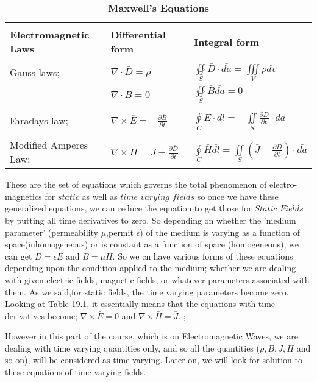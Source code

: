  \begin{table}[h]
 	\caption{\textbf{Maxwell's Equations}}
 	\centering
 	\begin{tabular}{p{3cm} p{2cm} p{2cm}}
 		\hline \\
 		\textbf{Electromagnetic Laws} & \textbf{Differential form} & \textbf{Integral form} \\ [0.5ex]
 		\hline \\
 		Gauss laws; & $\nabla\cdot\bar{D}=\rho$ & $\oiint\limits_S\bar{D}\cdot\bar{da}=\iiint\limits_V
 		\rho dv$\\
 		 & $\nabla\cdot\bar{B}=0$ & $\oiint\limits_S\bar{B}\bar{da}=0$\\
 		 \hline \\
 		 
 		 Faradays law; & $\nabla\times\bar{E}=-\frac{\partial\bar{B}}{\partial t}$ & $\oint\limits_C\bar{E}\cdot\bar{dl}=-\iint\limits_S\frac{\partial\bar{D}}{\partial t}\cdot\bar{da}$ \\
 		 \hline \\
 		 Modified Amperes Law; &
 		 $\nabla\times\bar{H}=\bar{J}+\frac{\partial\bar{D}}{\partial t}$ & $\oint\limits_C\bar{H}\bar{dl}=\iint\limits_S(\bar{J}+\frac{\partial\bar{D}}{\partial t})\cdot\bar{da}$ \\
 		 \hline
 	 	\end{tabular}
 \end{table}


These are the set of equations which governs the total phenomenon of electro-magnetics for $static$ as well as $time$ $varying$ $fields$ so once we have these generalized equations, we can reduce the equation to get those for $Static$ $Fields$ by putting all time derivatives to zero. So depending on whether the 'medium parameter' (permeability $\mu$,permit $\epsilon$) of the medium is varying as a function of space(inhomogeneous) or is constant as a function of space (homogeneous), we can get $\bar{D}=\epsilon\bar{E}$ and $\bar{B}=\mu\bar{H}$. So we cn have various forms of these equations depending upon the condition applied to the medium; whether we are dealing with given electric fields, magnetic fields, or whatever parameters associated with them. As we said,for static fields, the time varying parameters become zero. Looking at Table 19.1, it essentially means that the equations with time derivatives become; $\nabla\times\bar{E}=0$ and $\nabla\times\bar{H}=\bar{J}$.
;

However in this part of the course, which is on Electromagnetic Waves, we are dealing with time varying quantities only, and so all the quantities ($\rho,\bar{B},\bar{J},\bar{H}$ and so on), will be considered as time varying. Later on, we will look for solution to these equations of time varying fields.


